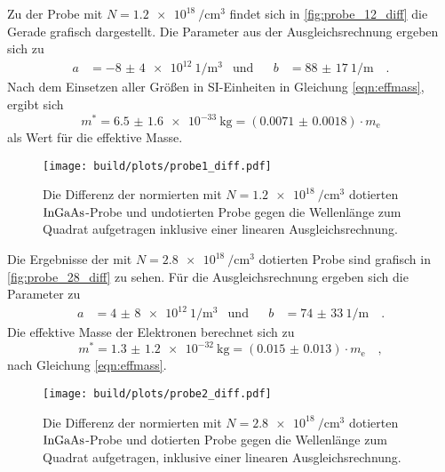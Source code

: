     \noindent Zu der Probe mit $N = \SI{1.2e18}{\per\centi\metre\tothe{3}}$ findet sich in \autoref{fig:probe_12_diff} die Gerade grafisch dargestellt. 
    Die Parameter aus der Ausgleichsrechnung ergeben sich zu 
    \begin{align*}
        a &= \SI{-8(4)e12}{1\per\metre\tothe{3}} & \text{und} & & b &= \SI{88(17)}{1\per\metre}\quad .
    \end{align*}
    Nach dem Einsetzen aller Größen in SI-Einheiten in Gleichung \eqref{eqn:effmass}, ergibt sich 
    \begin{equation*}
        m^* = \SI{6.5(16)e-33}{\kilo\gram} = \left(\num{0.0071(18)}\right)\cdot m_\text{e}
    \end{equation*}
    als Wert für die effektive Masse. 

    \begin{figure}[H]
        \centering
        \texttt{[image: build/plots/probe1\_diff.pdf]}
        \caption{Die Differenz der normierten mit $N = \SI{1.2e18}{\per\centi\metre\tothe{3}}$ dotierten $\ce{InGaAs}$-Probe und undotierten Probe gegen 
        die Wellenlänge zum Quadrat aufgetragen inklusive einer linearen Ausgleichsrechnung.}
        \label{fig:probe_12_diff}
    \end{figure}

    \noindent Die Ergebnisse der mit $N = \SI{2.8e18}{\per\centi\metre\tothe{3}}$ dotierten Probe sind grafisch in \autoref{fig:probe_28_diff} zu sehen. 
    Für die Ausgleichsrechnung ergeben sich die Parameter zu 
    \begin{align*}
        a &= \SI{4(8)e12}{1\per\metre\tothe{3}} & \text{und} & & b &= \SI{74(33)}{1\per\metre}\quad .
    \end{align*}
    Die effektive Masse der Elektronen berechnet sich zu 
    \begin{equation*}
        m^* = \SI{1.3(12)e-32}{\kilo\gram} = \left(\num{0.015(13)}\right)\cdot m_\text{e} \quad ,
    \end{equation*}
    nach Gleichung \eqref{eqn:effmass}.

    \begin{figure}[H]
        \centering
        \texttt{[image: build/plots/probe2\_diff.pdf]}
        \caption{Die Differenz der normierten mit $N = \SI{2.8e18}{\per\centi\metre\tothe{3}}$ dotierten $\ce{InGaAs}$-Probe und dotierten Probe gegen 
        die Wellenlänge zum Quadrat aufgetragen, inklusive einer linearen Ausgleichsrechnung.}
        \label{fig:probe_28_diff}
    \end{figure}